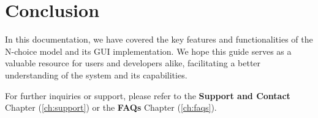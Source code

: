 \chapter{Conclusion}\label{ch:conclusion}
In this documentation, we have covered the key features and functionalities of the N-choice model and its GUI implementation. We hope this guide serves as a valuable resource for users and developers alike, facilitating a better understanding of the system and its capabilities.

For further inquiries or support, please refer to the \textbf{Support and Contact} Chapter (\ref{ch:support}) or the \textbf{FAQs} Chapter (\ref{ch:faqs}).